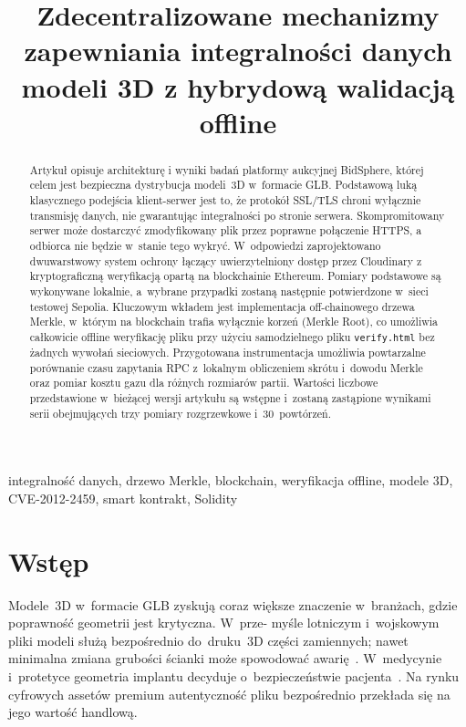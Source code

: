 \documentclass[10pt,conference,a4paper]{IEEEtran}
\title{Zdecentralizowane mechanizmy zapewniania integralności
       danych modeli 3D z hybrydową walidacją offline}
\author{
  \IEEEauthorblockN{Jakub Kalankiewicz}
  \IEEEauthorblockA{Wydział Elektroniki i Technik Informacyjnych\\
    Politechnika Warszawska\\
    Warszawa, Polska\\
    \texttt{[DO UZUPEŁNIENIA: adres e-mail PW]}}
}
\begin{document}
\maketitle

\begin{abstract}
Artykuł opisuje architekturę i wyniki badań platformy aukcyjnej
BidSphere, której celem jest bezpieczna dystrybucja modeli~3D
w~formacie GLB. Podstawową luką klasycznego podejścia
klient-serwer jest to, że protokół SSL/TLS chroni wyłącznie
transmisję danych, nie gwarantując integralności po stronie
serwera. Skompromitowany serwer może dostarczyć zmodyfikowany
plik przez poprawne połączenie HTTPS, a odbiorca nie będzie
w~stanie tego wykryć. W~odpowiedzi zaprojektowano dwuwarstwowy
system ochrony łączący uwierzytelniony dostęp przez Cloudinary
z kryptograficzną weryfikacją opartą na blockchainie Ethereum.
Pomiary podstawowe są wykonywane lokalnie, a~wybrane przypadki
zostaną następnie potwierdzone w~sieci testowej Sepolia. Kluczowym wkładem jest implementacja
off-chainowego drzewa Merkle, w~którym na blockchain trafia
wyłącznie korzeń (Merkle Root), co umożliwia całkowicie
offline weryfikację pliku przy użyciu samodzielnego pliku
\texttt{verify.html} bez żadnych wywołań sieciowych.
Przygotowana instrumentacja umożliwia powtarzalne porównanie
czasu zapytania RPC z~lokalnym obliczeniem skrótu i~dowodu
Merkle oraz pomiar kosztu gazu dla różnych rozmiarów partii.
Wartości liczbowe przedstawione w~bieżącej wersji artykułu są
wstępne i~zostaną zastąpione wynikami serii obejmujących trzy
pomiary rozgrzewkowe i~30~powtórzeń.
\end{abstract}

\begin{IEEEkeywords}
integralność danych, drzewo Merkle, blockchain, weryfikacja
offline, modele 3D, CVE-2012-2459, smart kontrakt, Solidity
\end{IEEEkeywords}

\section{Wstęp}

Modele~3D w~formacie GLB zyskują coraz większe znaczenie
w~branżach, gdzie poprawność geometrii jest krytyczna. W~prze-
myśle lotniczym i~wojskowym pliki modeli służą bezpośrednio
do~druku~3D części zamiennych; nawet minimalna zmiana grubości
ścianki może spowodować awarię~\cite{iso_am}. W~medycynie
i~protetyce geometria implantu decyduje o~bezpieczeństwie
pacjenta~\cite{fda_additive}. Na rynku cyfrowych assetów
premium autentyczność pliku bezpośrednio przekłada się na jego
wartość handlową.
\end{document}
